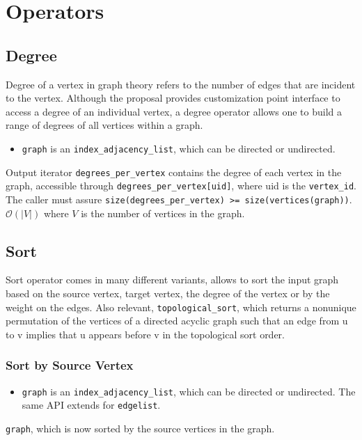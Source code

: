 \chapter{Operators}
\section{Degree}
Degree of a vertex in graph theory refers to the number of edges that are incident to the vertex. Although the proposal provides customization point interface to access a degree of an individual vertex, a degree operator allows one to build a range of degrees of all vertices within a graph.
{\small
      
}
\begin{itemdescr}
      \pnum\preconditions
      \begin{itemize}
            \item
                  \lstinline{graph} is an \lstinline{index_adjacency_list}, which can be directed or undirected. 
      \end{itemize}
      \pnum\effects Output iterator \lstinline{degrees_per_vertex} contains the degree of each vertex in the graph, accessible through \lstinline{degrees_per_vertex[uid]}, where uid is the \lstinline{vertex_id}. The caller must assure \lstinline{size(degrees_per_vertex) >= size(vertices(graph))}.
      \pnum\complexity $\mathcal{O}(|V|)$ where $V$ is the number of vertices in the graph.
\end{itemdescr}

\section{Sort}
Sort operator comes in many different variants, allows to sort the input graph based on the source vertex, target vertex, the degree of the vertex or by the weight on the edges. Also relevant, \lstinline{topological_sort}, which returns a nonunique permutation of the vertices of a directed acyclic graph such that an edge from u to v implies that u appears before v in the topological sort order.

\subsection{Sort by Source Vertex}
{\small
      
}
\begin{itemdescr}
    \pnum\preconditions
    \begin{itemize}
          \item
                \lstinline{graph} is an \lstinline{index_adjacency_list}, which can be directed or undirected. The same API extends for \lstinline{edgelist}.
    \end{itemize}
    \pnum\effects \lstinline{graph}, which is now sorted by the source vertices in the graph.
\end{itemdescr}

